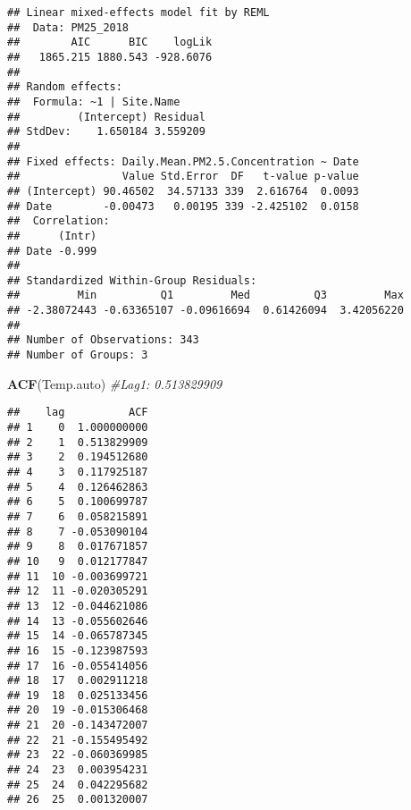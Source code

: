 \documentclass[]{article}
\newenvironment{Shaded}{\begin{snugshade}}{\end{snugshade}}
\newcommand{\KeywordTok}[1]{\textcolor[rgb]{0.13,0.29,0.53}{\textbf{#1}}}
\newcommand{\DataTypeTok}[1]{\textcolor[rgb]{0.13,0.29,0.53}{#1}}
\newcommand{\DecValTok}[1]{\textcolor[rgb]{0.00,0.00,0.81}{#1}}
\newcommand{\FloatTok}[1]{\textcolor[rgb]{0.00,0.00,0.81}{#1}}
\newcommand{\StringTok}[1]{\textcolor[rgb]{0.31,0.60,0.02}{#1}}
\newcommand{\CommentTok}[1]{\textcolor[rgb]{0.56,0.35,0.01}{\textit{#1}}}
\newcommand{\OperatorTok}[1]{\textcolor[rgb]{0.81,0.36,0.00}{\textbf{#1}}}
\newcommand{\NormalTok}[1]{#1}
\begin{document}
\begin{verbatim}
## Linear mixed-effects model fit by REML
##  Data: PM25_2018 
##        AIC      BIC    logLik
##   1865.215 1880.543 -928.6076
## 
## Random effects:
##  Formula: ~1 | Site.Name
##         (Intercept) Residual
## StdDev:    1.650184 3.559209
## 
## Fixed effects: Daily.Mean.PM2.5.Concentration ~ Date 
##                Value Std.Error  DF   t-value p-value
## (Intercept) 90.46502  34.57133 339  2.616764  0.0093
## Date        -0.00473   0.00195 339 -2.425102  0.0158
##  Correlation: 
##      (Intr)
## Date -0.999
## 
## Standardized Within-Group Residuals:
##         Min          Q1         Med          Q3         Max 
## -2.38072443 -0.63365107 -0.09616694  0.61426094  3.42056220 
## 
## Number of Observations: 343
## Number of Groups: 3
\end{verbatim}

\begin{Shaded}
\begin{Highlighting}[]
\KeywordTok{ACF}\NormalTok{(Temp.auto) }\CommentTok{#Lag1: 0.513829909}
\end{Highlighting}
\end{Shaded}

\begin{verbatim}
##    lag          ACF
## 1    0  1.000000000
## 2    1  0.513829909
## 3    2  0.194512680
## 4    3  0.117925187
## 5    4  0.126462863
## 6    5  0.100699787
## 7    6  0.058215891
## 8    7 -0.053090104
## 9    8  0.017671857
## 10   9  0.012177847
## 11  10 -0.003699721
## 12  11 -0.020305291
## 13  12 -0.044621086
## 14  13 -0.055602646
## 15  14 -0.065787345
## 16  15 -0.123987593
## 17  16 -0.055414056
## 18  17  0.002911218
## 19  18  0.025133456
## 20  19 -0.015306468
## 21  20 -0.143472007
## 22  21 -0.155495492
## 23  22 -0.060369985
## 24  23  0.003954231
## 25  24  0.042295682
## 26  25  0.001320007
\end{verbatim}

\begin{Shaded}
\end{Shaded}
\end{document}
